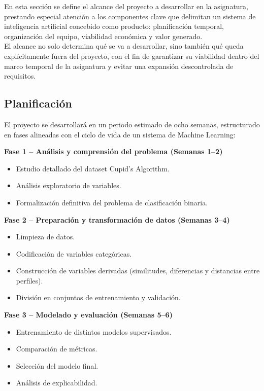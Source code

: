 En esta sección se define el alcance del proyecto a desarrollar en la asignatura, prestando especial atención a los componentes clave que delimitan un sistema de inteligencia artificial concebido como producto: planificación temporal, organización del equipo, viabilidad económica y valor generado.\\

El alcance no solo determina qué se va a desarrollar, sino también qué queda explícitamente fuera del proyecto, con el fin de garantizar su viabilidad dentro del marco temporal de la asignatura y evitar una expansión descontrolada de requisitos.

\subsection{Planificación}

El proyecto se desarrollará en un periodo estimado de ocho semanas, estructurado en fases alineadas con el ciclo de vida de un sistema de Machine Learning:

\textbf{Fase 1 – Análisis y comprensión del problema (Semanas 1–2)}
\begin{itemize}
    \item Estudio detallado del dataset Cupid’s Algorithm.
    \item Análisis exploratorio de variables.
    \item Formalización definitiva del problema de clasificación binaria.
\end{itemize}

\textbf{Fase 2 – Preparación y transformación de datos (Semanas 3–4)}
\begin{itemize}
    \item Limpieza de datos.
    \item Codificación de variables categóricas.
    \item Construcción de variables derivadas (similitudes, diferencias y distancias entre perfiles).
    \item División en conjuntos de entrenamiento y validación.
\end{itemize}

\textbf{Fase 3 – Modelado y evaluación (Semanas 5–6)}
\begin{itemize}
    \item Entrenamiento de distintos modelos supervisados.
    \item Comparación de métricas.
    \item Selección del modelo final.
    \item Análisis de explicabilidad.
\end{itemize}

